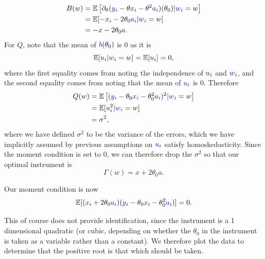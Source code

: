 \documentclass{article}
\renewcommand{\r}[1]{\textcolor{blue}{#1}}
\newcommand{\E}{\mathbb{E}}
\begin{document}
\begin{equation}\begin{split} B(w) &= \E\left[\partial_{\theta}(\r{y}_{i}-\theta\r{x}_{i}-\theta^{2}\r{a}_{i})(\theta_{0})|\r{w}_{i}=w\right] \\ &= \E[-\r{x}_{i}-2\theta_{0}\r{a}_{i}|\r{w}_{i}=w]\\
&=-x-2\theta_{0}a.
\end{split}\end{equation}
For $Q$, note that the mean of $\r{b}(\theta_{0})$ is 0 as it is 
\begin{equation} \E[\r{u}_{i}|\r{w}_{i}=w]=\E[\r{u}_{i}]=0,\end{equation}
where the first equality comes from noting the independence of $\r{u}_{i}$ and $\r{w}_{i}$, and the second equality comes from noting that the mean of $\r{u}_{i}$ is 0. Therefore
\begin{equation}\begin{split} Q(w) &= \E\left[(\r{y}_{i}-\theta_{0}\r{x}_{i}-\theta_{0}^{2}\r{a}_{i})^{2}|\r{w}_{i}=w\right]\\
&=\E[\r{u}_{i}^{2}|\r{w}_{i}=w]\\
&=\sigma^{2},
\end{split}\end{equation}
where we have defined $\sigma^{2}$ to be the variance of the errors, which we have implicitly assumed by previous assumptions on $\r{u}_{i}$ satisfy homoskedasticity. Since the moment condition is set to 0, we can therefore drop the $\sigma^{2}$ so that our optimal instrument is 
\begin{equation} \Gamma(w) = x+2\theta_{0}a.
\end{equation}

Our moment condition is now
\begin{equation} \E[(\r{x}_{i}+2\theta_{0}\r{a}_{i})(\r{y}_{i}-\theta_{0}\r{x}_{i}-\theta_{0}^{2}\r{a}_{i})]=0.\end{equation}

This of course does not provide identification, since the instrument is a 1 dimensional quadratic (or cubic, depending on whether the $\theta_{0}$ in the instrument is taken as a variable rather than a constant). We therefore plot the data to determine that the positive root is that which should be taken.
\end{document}
